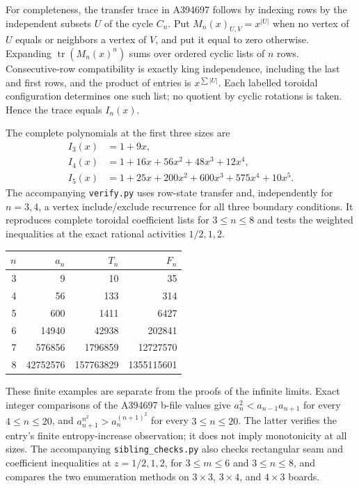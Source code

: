 \documentclass[10pt]{article}
\begin{document}
For completeness, the transfer trace in A394697 follows by indexing
rows by the independent subsets $U$ of the cycle $C_n$. Put
$M_n(x)_{U,V}=x^{|U|}$ when no vertex of $U$ equals or neighbors
a vertex of $V$, and put it equal to zero otherwise. Expanding
$\operatorname{tr}(M_n(x)^n)$ sums over ordered cyclic lists of
$n$ rows. Consecutive-row compatibility is exactly king independence,
including the last and first rows, and the product of entries is
$x^{\sum |U|}$. Each labelled toroidal configuration determines one
such list; no quotient by cyclic rotations is taken. Hence the trace
equals $I_n(x)$.

The complete polynomials at the first three sizes are
\begin{align*}
 I_3(x)&=1+9x,\\
 I_4(x)&=1+16x+56x^2+48x^3+12x^4,\\
 I_5(x)&=1+25x+200x^2+600x^3+575x^4+10x^5.
\end{align*}
The accompanying \texttt{verify.py} uses row-state transfer and,
independently for $n=3,4$, a vertex include/exclude recurrence for all
three boundary conditions. It reproduces complete toroidal
coefficient lists for $3\leq n\leq8$ and tests the weighted
inequalities at the exact rational activities $1/2,1,2$.
\begin{center}
\begin{tabular}{@{}rrrr@{}}
\toprule $n$ & $a_n$ & $T_n$ & $F_n$\\\midrule
3&9&10&35\\
4&56&133&314\\
5&600&1411&6427\\
6&14940&42938&202841\\
7&576856&1796859&12727570\\
8&42752576&157763829&1355115601\\\bottomrule
\end{tabular}
\end{center}
These finite examples are separate from the proofs of the infinite
limits.
Exact integer comparisons of the A394697 b-file values give
$a_n^2<a_{n-1}a_{n+1}$ for every $4\leq n\leq20$, and
$a_{n+1}^{n^2}>a_n^{(n+1)^2}$ for every $3\leq n\leq20$.
The latter verifies the entry's finite entropy-increase observation;
it does not imply monotonicity at all sizes. The accompanying
\texttt{sibling\_checks.py} also checks rectangular seam and
coefficient inequalities at $z=1/2,1,2$, for $3\leq m\leq6$ and
$3\leq n\leq8$, and compares the two enumeration methods on
$3\times3$, $3\times4$, and $4\times3$ boards.
\end{document}
